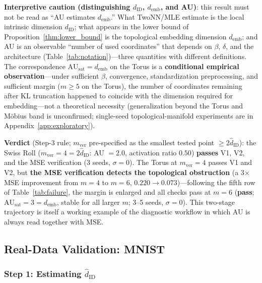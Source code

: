 \documentclass[make,article,submit,pdftex,moreauthors]{Definitions/mdpi}
\newcommand{\dID}{d_{\mathrm{ID}}}
\newcommand{\hatdID}{\hat{d}_{\mathrm{ID}}}
\newcommand{\AUsat}{\mathrm{AU}_{\mathrm{sat}}}
\newcommand{\demb}{d_{\mathrm{emb}}}
\begin{document}
\textbf{Interpretive caution (distinguishing $\dID$, $\demb$, and AU)}:
this result must not be read as ``AU estimates $\demb$.''
What TwoNN/MLE estimate is the local intrinsic dimension $\dID$; what
appears in the lower bound of Proposition~\ref{thm:lower_bound} is the
topological embedding dimension $\demb$; and AU is an observable ``number of
used coordinates'' that depends on $\beta$, $\delta$, and the architecture
(Table~\ref{tab:notation})---three quantities with different definitions.
The correspondence $\AUsat = \demb$ on the Torus is a \textbf{conditional
empirical observation}---under sufficient $\beta$, convergence,
standardization preprocessing, and sufficient margin ($m \geq 5$ on the
Torus), the number of coordinates remaining after KL
truncation happened to coincide with the dimension required for
embedding---not a theoretical necessity
(generalization beyond the Torus and M\"obius band is unconfirmed;
single-seed topological-manifold experiments are in
Appendix~\ref{app:exploratory}).

\textbf{Verdict} (Step-3 rule; $m_{\mathrm{ver}}$ pre-specified as the
smallest tested point $\geq 2\hatdID$): the Swiss Roll
($m_{\mathrm{ver}} = 4 = 2\hatdID$: AU $= 2.0$, activation ratio $0.50$)
\textbf{passes} V1, V2, and the MSE verification (3 seeds, $\sigma = 0$).
The Torus at $m_{\mathrm{ver}} = 4$ passes V1 and V2, but \textbf{the MSE
verification detects the topological obstruction} (a 3$\times$ MSE
improvement from $m = 4$ to $m = 6$, $0.220 \to 0.073$)---following the
fifth row of Table~\ref{tab:failure}, the margin is enlarged and all
checks pass at $m = 6$ (\textbf{pass}; $\AUsat = 3 = \demb$, stable for
all larger $m$; 3--5 seeds, $\sigma = 0$).
This two-stage trajectory is itself a working example of the diagnostic
workflow in which AU is always read together with MSE.

\subsection{Real-Data Validation: MNIST}\label{sec:exp_mnist}

\subsubsection{Step 1: Estimating $\hatdID$}
\end{document}
